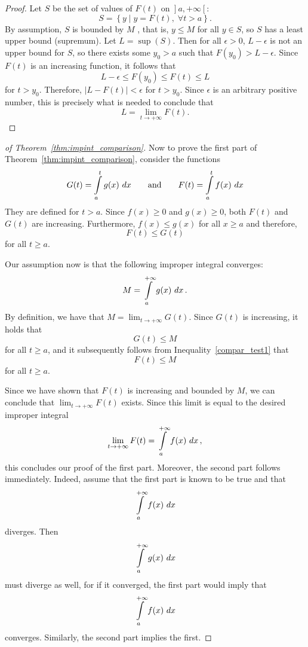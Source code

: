 \begin{proof}
Let $S$ be the set of values of $F(t)$ on  $\left.\right]a,+\infty\left[\right.$:
$$
S=\left\{y\mid y=F(t), \; \forall t> a\right\}.
$$
By assumption, $S$ is bounded by $M$ , that is, $y\leq M$ for all $y\in S$, so $S$ has a least upper bound (supremum). Let
$L=\sup(S)$. Then for all $\epsilon>0$, $L-\epsilon$ is not an upper bound for $S$, so there exists some $y_0>a$ such that $F(y_0)>L- \epsilon$. Since $F(t)$ is an increasing function, it follows that
$$
L-\epsilon\leq F(y_0)\leq F(t)\leq L
$$
for $t>y_0$. Therefore, $\left|L-F(t)\right|<\epsilon$ for $t>y_0$. Since $\epsilon$ is an arbitrary positive number, this is
precisely what is needed to conclude that
$$L=\lim_{t\to+\infty}F(t).$$
\phantom{}
\end{proof}

\begin{proof}[of Theorem~\ref{thm:impint_comparison}]
Now to prove the first part of Theorem~\ref{thm:impint_comparison}, consider the functions
$$
G(t)=\displaystyle \int\limits_a^t g(x)\ dx\qquad\text{and}\qquad F(t)=\displaystyle \int\limits_a^t f(x)\ dx
$$
They are defined for $t>a$. Since $f(x)\geq 0$  and $g(x)\geq0$, both $F(t)$ and $G(t)$ are increasing. Furthermore, $f(x)\leq g(x)$ for all $x\geq a$ and therefore,
\begin{equation}
F(t)\leq G(t)
\label{compar_test1}
\end{equation}
for all $t\geq a$.


Our assumption now is that the following improper integral converges:
$$
M= \ds \int\limits_a^{+\infty} g(x)\ dx\,.
$$
By definition, we have that $M=\displaystyle\lim_{t\to+\infty}G(t)$. Since $G(t)$ is increasing, it holds that
$$
G(t)\leq M
$$
for all $t\geq a$, and it subsequently follows from Inequality~\eqref{compar_test1} that
$$
F(t)\leq M
$$
for all $t\geq a$.

Since we have shown that $F(t)$ is increasing and bounded by $M$, we can  conclude that $\displaystyle\lim_{t\to+\infty}F(t)$ exists. Since this limit is equal to the desired improper integral
$$
\lim_{t\to+\infty}F(t)=\displaystyle \int\limits_a^{+\infty} f(x)\ dx\,,
$$
this concludes our proof of the first part. Moreover, the second part follows immediately. Indeed,  assume that the
first part is known to be true and that
$$
\displaystyle \int\limits_a^{+\infty} f(x)\ dx
$$
diverges. Then 
$$
\displaystyle \int\limits_a^{+\infty} g(x)\ dx
$$
must diverge as well, for if it converged, the first part would imply that
$$
\displaystyle \int\limits_a^{+\infty} f(x)\ dx
$$
converges. Similarly, the second part implies the first.
\end{proof}


